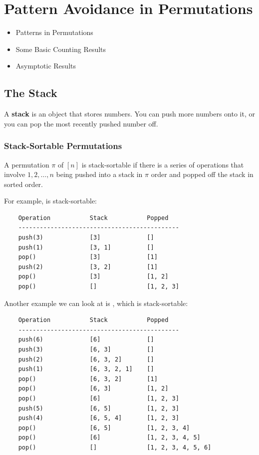 \documentclass[letterpaper]{article}
\begin{document}
\newpage 
\section{Pattern Avoidance in Permutations}
\begin{itemize}
    \item Patterns in Permutations 
    \item Some Basic Counting Results 
    \item Asymptotic Results 
\end{itemize}

\subsection{The Stack}
A \textbf{stack} is an object that stores numbers. You can push more numbers onto it, or you can pop the most recently pushed number off. 

\subsubsection{Stack-Sortable Permutations}
\begin{definition}{}{}
    A permutation $\pi$ of $[n]$ is stack-sortable if there is a series of operations that involve $1, 2, \dots, n$ being pushed into a stack in $\pi$ order and popped off the stack in sorted order. 
\end{definition}

For example,  is stack-sortable:
\begin{verbatim}
    Operation           Stack           Popped 
    ---------------------------------------------
    push(3)             [3]             []
    push(1)             [3, 1]          []
    pop()               [3]             [1]
    push(2)             [3, 2]          [1]
    pop()               [3]             [1, 2]
    pop()               []              [1, 2, 3]
\end{verbatim}

Another example we can look at is , which is stack-sortable:
\begin{verbatim}
    Operation           Stack           Popped 
    ---------------------------------------------
    push(6)             [6]             []
    push(3)             [6, 3]          []
    push(2)             [6, 3, 2]       []
    push(1)             [6, 3, 2, 1]    []
    pop()               [6, 3, 2]       [1]
    pop()               [6, 3]          [1, 2]
    pop()               [6]             [1, 2, 3]
    push(5)             [6, 5]          [1, 2, 3]
    push(4)             [6, 5, 4]       [1, 2, 3]
    pop()               [6, 5]          [1, 2, 3, 4]
    pop()               [6]             [1, 2, 3, 4, 5]
    pop()               []              [1, 2, 3, 4, 5, 6]
\end{verbatim}
\end{document}

